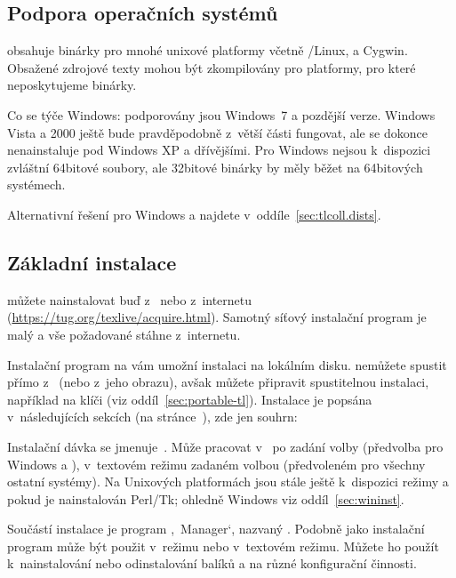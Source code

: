\documentclass[\classoptions,slovak,english,czech]{\classname}
\newcommand{\singleuv}[1]{,#1`}
\begin{document}
\subsection{Podpora operačních systémů}
\label{sec:os.support}

\TL{} obsahuje binárky pro mnohé unixové platformy
včetně \GNU/Linux, \MacOSX a Cygwin. 
Obsažené zdrojové texty mohou být zkompilovány
pro platformy, pro které neposkytujeme binárky.

Co se týče Windows: podporovány jsou Windows~7 a pozdější verze.
Windows Vista a 2000 ještě bude pravděpodobně z~větší části fungovat,
ale \TL{} se dokonce nenainstaluje pod Windows XP a dřívějšími. 
Pro Windows nejsou k~dispozici zvláštní 64bitové  soubory, ale
32bitové binárky by měly běžet na 64bitových systémech.
			
Alternativní řešení pro Windows a \MacOSX{} najdete 
v~oddíle~\ref{sec:tlcoll.dists}.

\subsection{Základní instalace \protect\TL{}}
\label{sec:basic}

\TL{} můžete nainstalovat buď z~\DVD{} nebo z~internetu 
(\url{https://tug.org/texlive/acquire.html}). Samotný síťový
instalační program je malý a vše požadované stáhne z~internetu. 

Instalační program na \DVD{} vám umožní instalaci na lokálním 
disku. \TL{} nemůžete spustit přímo z~\DVD{} 
(nebo z~jeho  obrazu), avšak můžete připravit
spustitelnou instalaci, například na klíči \USB{} (viz
oddíl~\ref{sec:portable-tl}). Instalace je popsána v~následujících 
sekcích (na stránce~\pageref{sec:install}), zde jen souhrn:
\begin{itemize*}
\item Instalační dávka se jmenuje \,.
Může pracovat v~ po zadání 
volby  (předvolba pro Windows a \MacOSX), 
v~textovém režimu zadaném volbou  
(předvoleném pro všechny ostatní systémy). Na Unixových platformách
jsou stále ještě k~dispozici režimy  a  
pokud je nainstalován Perl/Tk; ohledně Windows viz oddíl~\ref{sec:wininst}.

\item Součástí instalace je program
\singleuv{\TL\ Manager}, nazvaný .
Podobně jako instalační program může být použit 
v~režimu \GUI{} nebo v~textovém režimu. 
Můžete ho použít k~nainstalování nebo odinstalování 
balíků a na různé konfigurační činnosti.
\end{itemize*}
\end{document}

